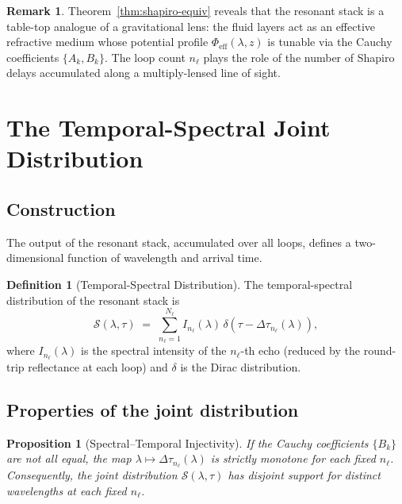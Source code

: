 \documentclass[11pt,twocolumn,a4paper]{article}
\theoremstyle{plain}
\newtheorem{proposition}[theorem]{Proposition}
\theoremstyle{definition}
\newtheorem{definition}[theorem]{Definition}
\newtheorem{remark}[theorem]{Remark}
\theoremstyle{remark}
\begin{document}
\begin{remark}
Theorem~\ref{thm:shapiro-equiv} reveals that the resonant stack is a table-top analogue of a gravitational lens: the fluid layers act as an effective refractive medium whose potential profile $\Phi_\text{eff}(\lambda,z)$ is tunable via the Cauchy coefficients $\{A_k,B_k\}$. The loop count $n_\ell$ plays the role of the number of Shapiro delays accumulated along a multiply-lensed line of sight.
\end{remark}

\section{The Temporal-Spectral Joint Distribution}
\label{sec:joint-distribution}

\subsection{Construction}

The output of the resonant stack, accumulated over all loops, defines a two-dimensional function of wavelength and arrival time.

\begin{definition}[Temporal-Spectral Distribution]
\label{def:joint-distribution}
The temporal-spectral distribution of the resonant stack is
\begin{equation}
\label{eq:joint-distribution}
  \mathcal{S}(\lambda,\tau) \;=\; \sum_{n_\ell=1}^{N_\ell} I_{n_\ell}(\lambda)\,\delta\!\left(\tau - \Delta\tau_{n_\ell}(\lambda)\right),
\end{equation}
where $I_{n_\ell}(\lambda)$ is the spectral intensity of the $n_\ell$-th echo (reduced by the round-trip reflectance at each loop) and $\delta$ is the Dirac distribution.
\end{definition}

\subsection{Properties of the joint distribution}

\begin{proposition}[Spectral--Temporal Injectivity]
\label{prop:injectivity}
If the Cauchy coefficients $\{B_k\}$ are not all equal, the map $\lambda\mapsto\Delta\tau_{n_\ell}(\lambda)$ is strictly monotone for each fixed $n_\ell$. Consequently, the joint distribution $\mathcal{S}(\lambda,\tau)$ has disjoint support for distinct wavelengths at each fixed $n_\ell$.
\end{proposition}
\end{document}
